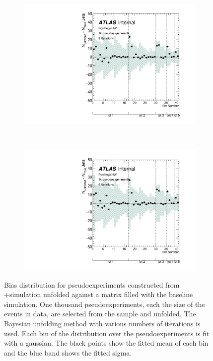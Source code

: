 \begin{figure}
\begin{subfigure}[]{0.5\textwidth}
\end{subfigure}
\\
\begin{subfigure}[]{0.5\textwidth}
\includegraphics[width=\textwidth]{fig/Stress/105860atlfast/Bias3Iterations.pdf}
\end{subfigure}
~
\begin{subfigure}[]{0.5\textwidth}
\includegraphics[width=\textwidth]{fig/Stress/105860atlfast/Bias4Iterations.pdf}
\end{subfigure}

\caption{Bias distribution for pseudoexperiments constructed from \pow+\hw simulation unfolded against a matrix filled with the baseline simulation. One thousand pseudoexperiments, each the size of the events in data, are selected from the sample and unfolded. The Bayesian unfolding method with various numbers of iterations is used. Each bin of the distribution over the pseudoexperiments is fit with a gaussian. The black points show the fitted mean of each bin and the blue band shows the fitted sigma. }
\label{fig:powhwbias}
\end{figure}

